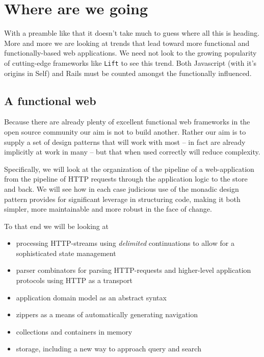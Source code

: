 \section{Where are we going}

With a preamble like that it doesn't take much to guess where all this
is heading. More and more we are looking at trends that lead toward
more functional and functionally-based web applications. We need not
look to the growing popularity of cutting-edge frameworks like
\texttt{Lift} to see this trend. Both Javascript (with it's origins in
Self) and Rails must be counted amongst the functionally influenced.

\subsection{A functional web}

Because there are already plenty of excellent functional web
frameworks in the open source community our aim is not to build
another. Rather our aim is to supply a set of design patterns that
will work with most -- in fact are already implicitly at work in many
-- but that when used correctly will reduce complexity.

Specifically, we will look at the organization of the pipeline of a
web-application from the pipeline of HTTP requests through the
application logic to the store and back. We will see how in each case
judicious use of the monadic design pattern provides for significant
leverage in structuring code, making it both simpler, more
maintainable and more robust in the face of change.

To that end we will be looking at

\begin{itemize}
  \item processing HTTP-streams using \emph{delimited}
  continuations to allow for a sophisticated state management
  \item parser combinators for parsing HTTP-requests and higher-level
    application protocols using HTTP as a transport
  \item application domain model as an abstract syntax
  \item zippers as a means of automatically generating navigation
  \item collections and containers in memory
  \item storage, including a new way to approach query and search
\end{itemize}

